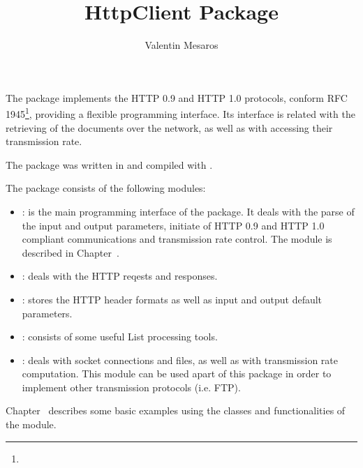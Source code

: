 \documentclass{ozdoc}
\title{HttpClient Package}
\author{Valentin Mesaros}
\begin{document}
\label{CHAPTER.INTRODUCTION}



  \mozartEMPTY
The  package implements the HTTP 0.9 and HTTP 1.0 protocols, conform RFC 1945\footnote{}, providing a flexible programming interface. Its interface is related with the retrieving of the documents over the network, as well as with accessing their transmission rate.  \mozartEMPTY


 \mozartEMPTY
The  package was written in  and compiled with .  \mozartEMPTY
 \mozartEMPTY


 \mozartEMPTY
The  package consists of the following modules: \mozartEMPTY
 \mozartEMPTY
\begin{itemize}
\item{}: is the main programming interface of the  package. It deals with the parse of the input and output parameters, initiate of HTTP 0.9 and HTTP 1.0 compliant communications and transmission rate control. The  module is described in Chapter~. \mozartEMPTY

\item{}: deals with the HTTP reqests and responses. \mozartEMPTY

\item{}: stores the HTTP header formats as well as input and output default parameters. \mozartEMPTY

\item{}: consists of some useful List processing tools. \mozartEMPTY

\item{}: deals with socket connections and files, as well as with transmission rate computation. This module can be used apart of this package in order to implement other transmission protocols (i.e. FTP).  \mozartEMPTY

\end{itemize}


Chapter~ describes some basic examples using the classes and functionalities of the  module. \mozartEMPTY
\end{document}
